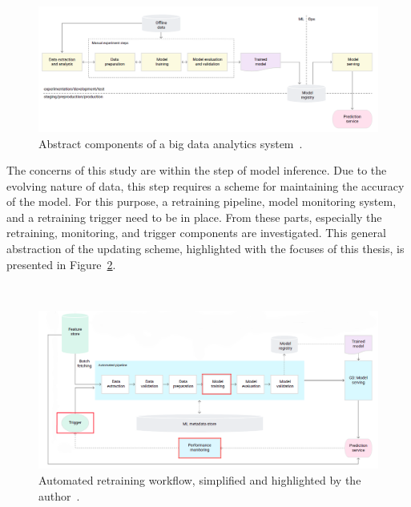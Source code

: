 \begin{figure}[hb]
\newline
\begin{center}
\includegraphics[width=1.0\columnwidth]{simplegoogle.png}
\caption{Abstract components of a big data analytics system~\cite{googlemlops}.}
\label{simplepipeline}
\end{center}
\end{figure}

The concerns of this study are within the step of model inference. Due to the evolving nature of data, this step requires a scheme for maintaining the accuracy of the model. For this purpose, a retraining pipeline, model monitoring system, and a retraining trigger need to be in place. From these parts, especially the retraining, monitoring, and trigger components are investigated. This general abstraction of the updating scheme, highlighted with the focuses of this thesis, is presented in Figure~\ref{triggerpipeline}.

\begin{figure}[ht]
\ \newline
\begin{center}
\includegraphics[width=1.0\columnwidth]{paivityssykli.png}
\caption{Automated retraining workflow, simplified and highlighted by the author~\cite{googlemlops}.}
\label{triggerpipeline}
\end{center}
\end{figure}


